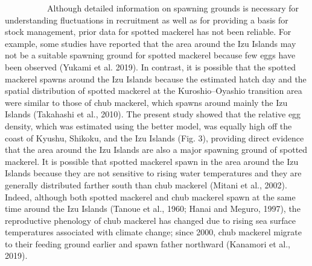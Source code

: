 \documentclass[12pt]{article}
\begin{document}
\begin{linenumbers}
\ \ \ \ \ \ \ \ \ \
Although detailed information on spawning grounds is necessary for understanding fluctuations in recruitment as well as for providing a basis for stock management, prior data for spotted mackerel has not been reliable. For example, some studies have reported that the area around the Izu Islands may not be a suitable spawning ground for spotted mackerel because few eggs have been observed (Yukami et al. 2019). In contrast, it is possible that the spotted mackerel spawns around the Izu Islands because the estimated hatch day and the spatial distribution of spotted mackerel at the Kuroshio--Oyashio transition area were similar to those of chub mackerel, which spawns around mainly the Izu Islands (Takahashi et al., 2010). The present study showed that the relative egg density, which was estimated using the better model, was equally high off the coast of Kyushu, Shikoku, and the Izu Islands (Fig. 3), providing direct evidence that the area around the Izu Islands are also a major spawning ground of spotted mackerel. It is possible that spotted mackerel spawn in the area around the Izu Islands because they are not sensitive to rising water temperatures and they are generally distributed farther south than chub mackerel (Mitani et al., 2002). Indeed, although both spotted mackerel and chub mackerel spawn at the same time around the Izu Islands (Tanoue et al., 1960; Hanai and Meguro, 1997), the reproductive phenology of chub mackerel has changed due to rising sea surface temperatures associated with climate change; since 2000, chub mackerel migrate to their feeding ground earlier and spawn father northward (Kanamori et al., 2019).


\end{linenumbers}
\end{document}
